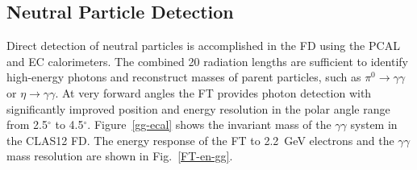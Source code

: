 \documentclass[final,3p,twocolumn]{elsarticle}
\begin{document}
\subsection{Neutral Particle Detection} 

Direct detection of neutral particles is accomplished in the FD using the PCAL and EC calorimeters. The combined
20 radiation lengths are sufficient to identify high-energy photons and reconstruct masses of parent particles, such
as $\pi^0\to \gamma \gamma$  or $\eta \to \gamma \gamma$. At very forward angles the FT provides photon
detection with significantly improved position and energy resolution in the polar angle range from 2.5$^\circ$ to
4.5$^\circ$. Figure~\ref{gg-ecal} shows the invariant mass of the $\gamma\gamma$ system in the CLAS12 FD.
The energy response of the FT to 2.2~GeV electrons and the $\gamma \gamma$ mass resolution are shown in
Fig.~\ref{FT-en-gg}. 
\end{document}
